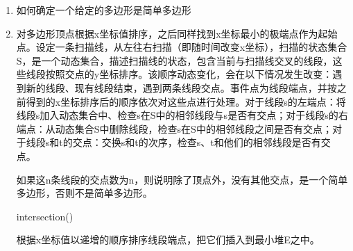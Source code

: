 \documentclass[12pt,a4paper]{article}
\makeatletter
\newtheorem*{solution}{Solution}
\theoremstyle{definition}
\renewenvironment{solution}[1][Solution] {\par\pushQED{\qed}\normalfont\topsep6\p@\@plus6\p@\relax\trivlist\item[\hskip\labelsep\bfseries#1\@addpunct{.}]\ignorespaces}{\popQED\endtrivlist\@endpefalse} \makeatother
\makeatother
\begin{document}
\begin{enumerate}
\item 如何确定一个给定的多边形是简单多边形
\begin{solution}
	对多边形顶点根据x坐标值排序，之后同样找到x坐标最小的极端点作为起始点。设定一条扫描线，从左往右扫描（即随时间改变x坐标），扫描的状态集合S，是一个动态集合，描述扫描线的状态，包含当前与扫描线交叉的线段，这些线段按照交点的y坐标排序。该顺序动态变化，会在以下情况发生改变：遇到新的线段、现有线段结束，遇到两条线段交点。事件点为线段端点，并按之前得到的x坐标排序后的顺序依次对这些点进行处理。对于线段s的左端点：将线段s加入动态集合中、检查s在S中的相邻线段与s是否有交点；对于线段s的右端点：从动态集合S中删除线段，检查s在S中的相邻线段之间是否有交点；对于线段s和t的交点：交换s和t的次序，检查s、t和他们的相邻线段是否有交点。
	
	如果这n条线段的交点数为n，则说明除了顶点外，没有其他交点，是一个简单多边形，否则不是简单多边形。
	\begin{center}
		\begin{algorithm}[H]
			\caption{intersection()}
			根据x坐标值以递增的顺序排序线段端点，把它们插入到最小堆E之中。
		\end{algorithm}
	\end{center}
	

\end{solution}
\end{enumerate}
\end{document}
